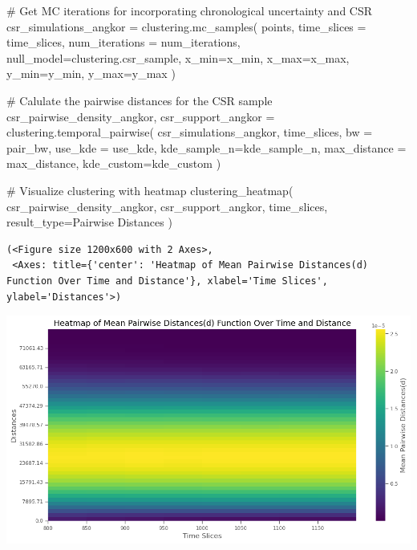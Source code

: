 \documentclass[
  11pt,
  letterpaper,
  DIV=11,
  numbers=noendperiod]{scrartcl}
\newenvironment{Shaded}{\begin{snugshade}}{\end{snugshade}}
\newcommand{\CommentTok}[1]{\textcolor[rgb]{0.37,0.37,0.37}{#1}}
\newcommand{\NormalTok}[1]{\textcolor[rgb]{0.00,0.23,0.31}{#1}}
\newcommand{\OperatorTok}[1]{\textcolor[rgb]{0.37,0.37,0.37}{#1}}
\newcommand{\StringTok}[1]{\textcolor[rgb]{0.13,0.47,0.30}{#1}}
\begin{document}
\begin{Shaded}
\begin{Highlighting}[]
\CommentTok{\# Get MC iterations for incorporating chronological uncertainty and CSR}
\NormalTok{csr\_simulations\_angkor }\OperatorTok{=}\NormalTok{ clustering.mc\_samples(}
\NormalTok{    points, }
\NormalTok{    time\_slices }\OperatorTok{=}\NormalTok{ time\_slices,  }
\NormalTok{    num\_iterations }\OperatorTok{=}\NormalTok{ num\_iterations,}
\NormalTok{    null\_model}\OperatorTok{=}\NormalTok{clustering.csr\_sample,}
\NormalTok{    x\_min}\OperatorTok{=}\NormalTok{x\_min, }
\NormalTok{    x\_max}\OperatorTok{=}\NormalTok{x\_max,}
\NormalTok{    y\_min}\OperatorTok{=}\NormalTok{y\_min, }
\NormalTok{    y\_max}\OperatorTok{=}\NormalTok{y\_max}
\NormalTok{)}

\CommentTok{\# Calulate the pairwise distances for the CSR sample}
\NormalTok{csr\_pairwise\_density\_angkor, csr\_support\_angkor }\OperatorTok{=}\NormalTok{ clustering.temporal\_pairwise(}
\NormalTok{    csr\_simulations\_angkor, }
\NormalTok{    time\_slices, }
\NormalTok{    bw }\OperatorTok{=}\NormalTok{ pair\_bw, }
\NormalTok{    use\_kde }\OperatorTok{=}\NormalTok{ use\_kde,}
\NormalTok{    kde\_sample\_n}\OperatorTok{=}\NormalTok{kde\_sample\_n, }
\NormalTok{    max\_distance }\OperatorTok{=}\NormalTok{ max\_distance,}
\NormalTok{    kde\_custom}\OperatorTok{=}\NormalTok{kde\_custom}
\NormalTok{)}

\CommentTok{\# Visualize clustering with heatmap}
\NormalTok{clustering\_heatmap(}
\NormalTok{    csr\_pairwise\_density\_angkor,}
\NormalTok{    csr\_support\_angkor,}
\NormalTok{    time\_slices,}
\NormalTok{    result\_type}\OperatorTok{=}\StringTok{\textquotesingle{}Pairwise Distances\textquotesingle{}}
\NormalTok{)}
\end{Highlighting}
\end{Shaded}

\begin{verbatim}
(<Figure size 1200x600 with 2 Axes>,
 <Axes: title={'center': 'Heatmap of Mean Pairwise Distances(d) Function Over Time and Distance'}, xlabel='Time Slices', ylabel='Distances'>)
\end{verbatim}

\includegraphics{analysis_files/figure-pdf/cell-11-output-2.png}
\end{document}
